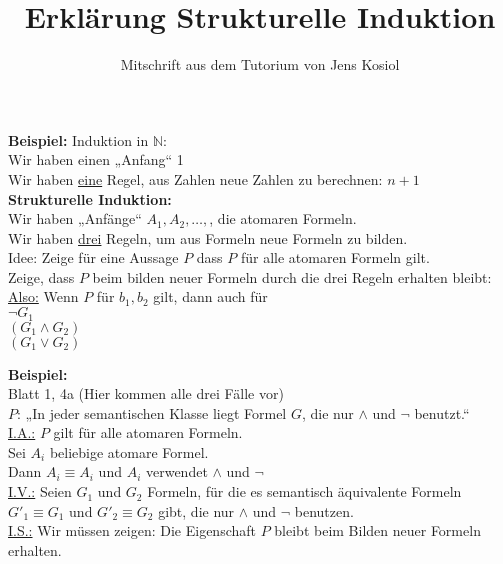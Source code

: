 \documentclass[a4paper]{scrartcl}
\begin{document}
\title{Erklärung Strukturelle Induktion}
\subtitle{Mitschrift aus dem Tutorium von Jens Kosiol}
\maketitle

\textbf{Beispiel:} Induktion in $\mathbb{N}$:\\
Wir haben einen „Anfang“ 1\\
Wir haben \underline{eine} Regel, aus Zahlen neue Zahlen zu berechnen: $n+1$\\


\textbf{Strukturelle Induktion:}\\
Wir haben „Anfänge“ $A_1, A_2, …, $, die atomaren Formeln.\\
Wir haben \underline{drei} Regeln, um aus Formeln neue Formeln zu bilden.\\

Idee: Zeige für eine Aussage $P$ dass $P$ für alle atomaren Formeln gilt.\\

Zeige, dass $P$ beim bilden neuer Formeln durch die drei Regeln erhalten bleibt:\\

\underline{Also:} Wenn $P$ für $b_1, b_2$ gilt, dann auch für\\
$\neg G_1$\\
$(G_1 \wedge G_2)$\\
$(G_1 \vee G_2)$\\

\newpage

\textbf{Beispiel:}\\
Blatt 1, 4a (Hier kommen alle drei Fälle vor)\\
$P$: „In jeder semantischen Klasse liegt Formel $G$, die nur $\wedge$ und $\neg$ benutzt.“\\
\underline{I.A.:} $P$ gilt für alle atomaren Formeln.\\
Sei $A_i$ beliebige atomare Formel.\\

Dann $A_i \equiv A_i$ und $A_i$ verwendet $\wedge$ und $\neg$\\
\underline{I.V.:} Seien $G_1$ und $G_2$ Formeln, für die es semantisch äquivalente Formeln $G'_1 \equiv G_1$ und $G'_2 \equiv G_2$ gibt, die nur $\wedge$ und $\neg$ benutzen.\\
\underline{I.S.:} Wir müssen zeigen: Die Eigenschaft $P$ bleibt beim Bilden neuer Formeln erhalten.\\
\end{document}
